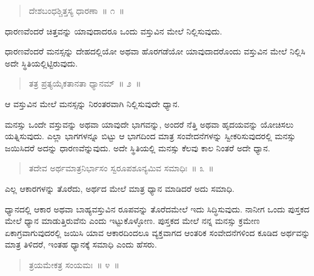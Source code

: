 \vspace{-0.36cm}

\begin{verse}
ದೇಶಬಂಧಶ್ಚಿತ್ತಸ್ಯ ಧಾರಣಾ~॥ ೧~॥
\end{verse}

\vspace{-0.4cm}

ಧಾರಣವೆಂದರೆ ಚಿತ್ತವನ್ನು ಯಾವುದಾದರೂ ಒಂದು ವಸ್ತುವಿನ ಮೇಲೆ ನಿಲ್ಲಿಸುವುದು. 

ಧಾರಣವೆಂದರೆ ಮನಸ್ಸನ್ನು ದೇಹದಲ್ಲಿಯೋ ಅಥವಾ ಹೊರಗಡೆಯೋ ಯಾವುದಾದರೊಂದು ವಸ್ತುವಿನ ಮೇಲೆ ನಿಲ್ಲಿಸಿ ಅದೇ ಸ್ಥಿತಿಯಲ್ಲಿಟ್ಟಿರುವುದು. 

\vspace{-0.36cm}

\begin{verse}
ತತ್ರ ಪ್ರತ್ಯಯೈಕತಾನತಾ ಧ್ಯಾನಮ್​~॥ ೨~॥
\end{verse}

\vspace{-0.4cm}

ಆ ವಸ್ತುವಿನ ಮೇಲೆ ಮನಸ್ಸನ್ನು ನಿರಂತರವಾಗಿ ನಿಲ್ಲಿಸುವುದೇ ಧ್ಯಾನ. 

ಮನಸ್ಸು ಒಂದೇ ವಸ್ತುವನ್ನು ಅಥವಾ ಯಾವುದೇ ಭಾಗವನ್ನು, ಅಂದರೆ ನೆತ್ತಿ ಅಥವಾ ಹೃದಯವನ್ನು ಯೋಚಿಸಲು ಯತ್ನಿಸುವುದು. ಎಲ್ಲಾ ಭಾಗಗಳನ್ನೂ ಬಿಟ್ಟು ಆ ಭಾಗದಿಂದ ಮಾತ್ರ ಸಂವೇದನೆಗಳನ್ನು ಸ್ವೀಕರಿಸುವುದರಲ್ಲಿ ಮನಸ್ಸು ಜಯಿಸಿದರೆ ಅದನ್ನು ಧಾರಣವೆನ್ನುವುದು. ಅದೇ ಸ್ಥಿತಿಯಲ್ಲಿ ಮನಸ್ಸು ಕೆಲವು ಕಾಲ ನಿಂತರೆ ಅದೇ ಧ್ಯಾನ. 

\vspace{-0.36cm}

\begin{verse}
ತದೇವ ಅರ್ಥಮಾತ್ರನಿರ್ಭಾಸಂ ಸ್ವರೂಪಶೂನ್ಯಮಿವ ಸಮಾಧಿಃ~॥ ೩~॥
\end{verse}

\vspace{-0.4cm}

ಎಲ್ಲ ಆಕಾರಗಳನ್ನು ತೊರೆದು, ಅರ್ಥದ ಮೇಲೆ ಮಾತ್ರ ಧ್ಯಾನ ಮಾಡಿದರೆ ಅದು ಸಮಾಧಿ. 

ಧ್ಯಾನದಲ್ಲಿ ಆಕಾರ ಅಥವಾ ಬಾಹ್ಯವಸ್ತುವಿನ ರೂಪವನ್ನು ತೊರೆದಮೇಲೆ ಇದು ಸಿದ್ಧಿಸುವುದು. ನಾನೀಗ ಒಂದು ಪುಸ್ತಕದ ಮೇಲೆ ಧ್ಯಾನ ಮಾಡುತ್ತಿರುವೆನು ಎಂದು ಇಟ್ಟುಕೊಳ್ಳೋಣ. ಪುಸ್ತಕದ ಮೇಲೆ ನನ್ನ ಮನಸ್ಸು ಕ್ರಮೇಣ ಏಕಾಗ್ರವಾಗುವುದರಲ್ಲಿ ಜಯಿಸಿ ಯಾವ ಆಕಾರದಿಂದಲೂ ವ್ಯಕ್ತವಾಗದ ಆಂತರಿಕ ಸಂವೇದನೆಗಳಿಂದ ಕೂಡಿದ ಅರ್ಥವನ್ನು ಮಾತ್ರ ತಿಳಿದರೆ, ಇಂತಹ ಧ್ಯಾನಕ್ಕೆ ಸಮಾಧಿ ಎಂದು ಹೆಸರು. 

\vspace{-0.36cm}

\begin{verse}
ತ್ರಯಮೇಕತ್ರ ಸಂಯಮಃ~॥ ೪~॥
\end{verse}

\vspace{-0.4cm}

